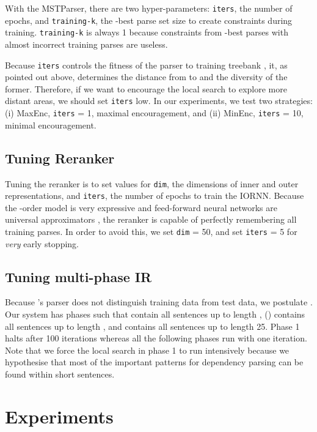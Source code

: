 \documentclass[11pt,letterpaper]{article}
\begin{document}
With the MSTParser, there are two hyper-parameters: 
\texttt{iters}, the number of epochs, and 
\texttt{training-k}, the -best parse set size to 
create constraints during training. \texttt{training-k} 
is always 1 because constraints from -best parses with 
almost incorrect training parses are useless.

Because \texttt{iters} controls the fitness of the 
parser to training treebank , it, as pointed 
out above, determines the distance from 
to  and the diversity of the former. Therefore, if we 
want to encourage the local search to explore more distant areas, we 
should set \texttt{iters} low. In our experiments, 
we test two strategies: (i) MaxEnc, \texttt{iters} = 1, 
maximal encouragement, and (ii) MinEnc, \texttt{iters} = 10, 
minimal encouragement.


\subsection{Tuning Reranker }

Tuning the reranker  is to set values for \texttt{dim}, 
the dimensions of inner and outer representations, and 
\texttt{iters}, the number of epochs to train the IORNN. 
Because the -order model is very expressive and feed-forward 
neural networks are universal approximators 
\cite{cybenko1989approximation}, the reranker is capable of perfectly 
remembering all training parses. In order to avoid this, we set 
\texttt{dim} = 50, and set \texttt{iters} = 5 
for \textit{very} early stopping.


\subsection{Tuning multi-phase IR}

Because 's parser does not distinguish 
training data from test data, we postulate . 
Our system has  phases such that  
contain all sentences up to length ,  ()
contains all sentences up to length , 
and  contains all sentences up to length 25.
Phase 1 halts after 100 iterations whereas all the following phases run 
with one iteration. Note that we force the local search in phase 1 to run 
intensively because we hypothesise that most of the important patterns for 
dependency parsing can be found within short sentences.


\section{Experiments}
\label{section experiments}
\end{document}
